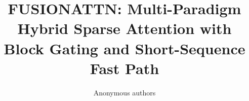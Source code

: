 \title{\textbf{FUSIONATTN: Multi-Paradigm Hybrid Sparse Attention with Block Gating and Short-Sequence Fast Path}}

\author{Anonymous authors}
